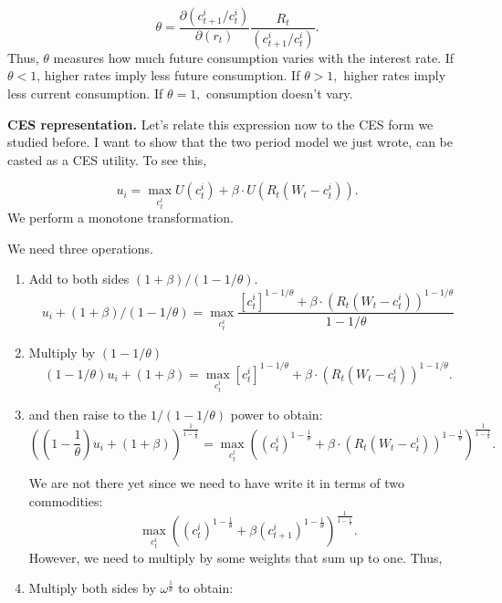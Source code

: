\documentclass{article}
\begin{document}
\begin{equation*}
\theta =\frac{\partial \left( c_{t+1}^{i}/c_{t}^{i}\right) }{\partial \left(
r_{t}\right) }\frac{R_{t}}{\left( c_{t+1}^{i}/c_{t}^{i}\right) }.
\end{equation*}%
Thus, $\theta $ measures how much future consumption varies with the
interest rate. If $\theta <1$, higher rates imply less future consumption.
If $\theta >1,$ higher rates imply less current consumption. If $\theta =1,$
consumption doesn't vary.

\textbf{CES representation.} Let's relate this expression now to the CES
form we studied before. I want to show that the two period model we just
wrote, can be casted as a CES utility. To see this,

\begin{equation*}
u_{i}=\max_{c_{t}^{i}}U\left( c_{t}^{i}\right) +\beta \cdot U\left(
R_{t}\left( W_{t}-c_{t}^{i}\right) \right) .
\end{equation*}%
We perform a monotone transformation.

We need three operations.

\begin{enumerate}
\item Add to both sides $\left( 1+\beta \right) /\left( 1-1/\theta \right) .$%
\begin{equation*}
u_{i}+\left( 1+\beta \right) /\left( 1-1/\theta \right) =\max_{c_{t}^{i}}%
\frac{\left[ c_{t}^{i}\right] ^{1-1/\theta }+\beta \cdot \left( R_{t}\left(
W_{t}-c_{t}^{i}\right) \right) ^{1-1/\theta }}{1-1/\theta }
\end{equation*}

\item Multiply by $\left( 1-1/\theta \right) $
\begin{equation*}
\left( 1-1/\theta \right) u_{i}+\left( 1+\beta \right) =\max_{c_{t}^{i}}
\left[ c_{t}^{i}\right] ^{1-1/\theta }+\beta \cdot \left( R_{t}\left(
W_{t}-c_{t}^{i}\right) \right) ^{1-1/\theta }.
\end{equation*}

\item and then raise to the $1/\left( 1-1/\theta \right) $ power to obtain:%
\begin{equation*}
\left( \left( 1-\frac{1}{\theta }\right) u_{i}+\left( 1+\beta \right)
\right) ^{\frac{1}{1-\frac{1}{\theta }}}=\max_{c_{t}^{i}}\left( \left(
c_{t}^{i}\right) ^{1-\frac{1}{\theta }}+\beta \cdot \left( R_{t}\left(
W_{t}-c_{t}^{i}\right) \right) ^{1-\frac{1}{\theta }}\right) ^{\frac{1}{1-%
\frac{1}{\theta }}}.
\end{equation*}

We are not there yet since we need to have write it in terms of two
commodities:%
\begin{equation*}
\max_{c_{t}^{i}}\left( \left( c_{t}^{i}\right) ^{1-\frac{1}{\theta }}+\beta
\left( c_{t+1}^{i}\right) ^{1-\frac{1}{\theta }}\right) ^{\frac{1}{1-\frac{1%
}{\theta }}}.
\end{equation*}%
However, we need to multiply by some weights that sum up to one. Thus,

\item Multiply both sides by $\omega ^{\frac{1}{\theta }}$ to obtain:
\end{enumerate}
\end{document}
